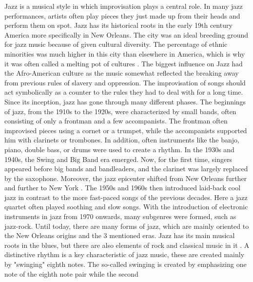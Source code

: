 Jazz is a musical style in which improvisation plays a central role.
In many jazz performances, artists often play pieces they just made up from their heads and
perform them on spot.
Jazz has its historical roots in the early 19th century America more specifically in New Orleans.
The city was an ideal breeding ground for jazz music because of given cultural diversity.
The percentage of ethnic minorities was much higher in this city than elsewhere in America,
which is why it was often called a melting pot of cultures \cite{Beek2021Jazz}. 
The biggest influence on Jazz had the Afro-American culture as the music somewhat
reflected the breaking away from previous rules of slavery and oppression.
The improvisation of songs should act symbolically as a counter to the rules they had to deal with for a
long time.
Since its inception, jazz has gone through many different phases.
The beginnings of jazz, from the 1910s to the 1920s, were characterized by small bands,
often consisting of only a frontman and a few accompanists.
The frontman often improvised pieces using a cornet or a trumpet,
while the accompanists supported him with clarinets or trombones.
In addition, often instruments like the banjo, piano, double bass, or drums were used to create a rhythm.
In the 1930s and 1940s, the Swing and Big Band era emerged.
Now, for the first time, singers appeared before big bands and bandleaders,
and the clarinet was largely replaced by the saxophone.
Moreover, the jazz epicenter shifted from New Orleans further and further to New York \cite{Wildridge2020}.
The 1950s and 1960s then introduced laid-back cool jazz in contrast to the more fast-paced songs
of the previous decades.
Here a jazz quartet often played soothing and slow songs. With the introduction of electronic
instruments in jazz from 1970 onwards, many subgenres were formed, such as jazz-rock.
Until today, there are many forms of jazz, which are mainly oriented to the New Orleans origins
and the 3 mentioned eras.
Jazz has its main musical roots in the blues, but there are also elements of rock and classical music in it \cite{JazzAmHistory}.
A distinctive rhythm is a key characteristic of jazz music,
these are created mainly by "swinging" eighth notes.
The so-called swinging is created by emphasizing one note of the eighth note pair while the second
